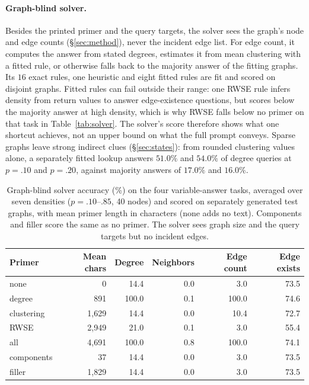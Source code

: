 \documentclass[11pt]{article}
\begin{document}
\paragraph{Graph-blind solver.} Besides the printed primer and the query targets, the solver sees the graph's node and edge counts (\S\ref{sec:method}), never the incident edge list. For edge count, it computes the answer from stated degrees, estimates it from mean clustering with a fitted rule, or otherwise falls back to the majority answer of the fitting graphs. Its $16$ exact rules, one heuristic and eight fitted rules are fit and scored on disjoint graphs. Fitted rules can fail outside their range: one RWSE rule infers density from return values to answer edge-existence questions, but scores below the majority answer at high density, which is why RWSE falls below no primer on that task in Table~\ref{tab:solver}. The solver's score therefore shows what one shortcut achieves, not an upper bound on what the full prompt conveys. %
Sparse graphs leave strong indirect clues (\S\ref{sec:states}): from rounded clustering values alone, a separately fitted lookup answers $51.0\%$ and $54.0\%$ of degree queries at $p=.10$ and $p=.20$, against majority answers of $17.0\%$ and $16.0\%$. %

\begin{table}[h]
\centering\scriptsize
\setlength{\tabcolsep}{2.7pt}
\begin{tabular}{lrrrrr}
\toprule
Primer & Mean chars & Degree & Neighbors & Edge count & Edge exists\\
\midrule
none & 0 & 14.4 & 0.0 & 3.0 & 73.5\\ %
degree & 891 & 100.0 & 0.1 & 100.0 & 74.6\\ %
clustering & 1,629 & 14.4 & 0.0 & 10.4 & 72.7\\ %
RWSE & 2,949 & 21.0 & 0.1 & 3.0 & 55.4\\ %
all & 4,691 & 100.0 & 0.8 & 100.0 & 74.1\\ %
components & 37 & 14.4 & 0.0 & 3.0 & 73.5\\ %
filler & 1,829 & 14.4 & 0.0 & 3.0 & 73.5\\ %
\bottomrule
\end{tabular}
\caption{Graph-blind solver accuracy (\%) on the four variable-answer tasks, averaged over seven densities ($p=.10$--$.85$, 40 nodes) and scored on separately generated test graphs, with mean primer length in characters (none adds no text). Components and filler score the same as no primer. The solver sees graph size and the query targets but no incident edges.} %
\label{tab:solver}\label{tab:primerlength}
\end{table}
\end{document}
